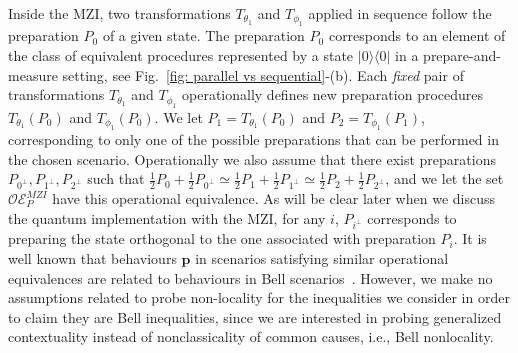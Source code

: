 \documentclass[letterpaper,onecolumn,12pt,accepted=2024-01-17]{article}
\begin{document}
Inside the MZI, two transformations $T_{\theta_1}$ and $T_{\phi_1}$ applied in sequence follow the preparation $P_0$ of a given state. The preparation $P_0$ corresponds to an element of the class of equivalent procedures represented by a state $\vert 0 \rangle \langle 0 \vert$ in a prepare-and-measure setting, see Fig.~\ref{fig: parallel vs sequential}-(b). Each \textit{fixed} pair of transformations $T_{\theta_1}$ and $T_{\phi_1}$ operationally defines new preparation procedures $T_{\theta_1}(P_0)$ and $T_{\phi_1}(P_0)$. We let $P_1 = T_{\theta_1}(P_0)$ and $P_2 = T_{\phi_1}(P_1)$, corresponding to only one of the possible preparations that can be performed in the chosen scenario. Operationally we also assume that there exist preparations $P_{0^\perp},P_{1^\perp},P_{2^\perp}$ such that $\frac{1}{2}P_0+\frac{1}{2}P_{0^\perp}\simeq \frac{1}{2}P_1+\frac{1}{2}P_{1^\perp} \simeq \frac{1}{2}P_{2}+\frac{1}{2}P_{2^\perp}$, and we let the set $\mathcal{OE}_P^{MZI}$ have this operational equivalence. {As will be clear later when we discuss the quantum implementation with the MZI, for any $i$, $P_{i^\perp}$ corresponds to preparing the state orthogonal to the one associated with preparation $P_i$.} It is well known that behaviours $\mathbf{p}$ in scenarios satisfying similar operational equivalences are related to behaviours in Bell scenarios~\cite{chaturvedi2021characterising}. However, we make no assumptions related to probe non-locality for the inequalities we consider in order to claim they are Bell inequalities, since we are interested in probing generalized contextuality instead of nonclassicality of common causes, i.e., Bell nonlocality.
\end{document}
